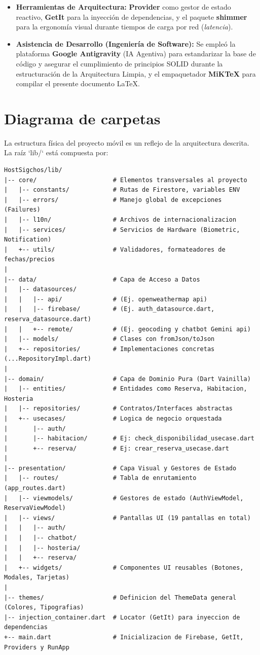 \documentclass[12pt,letterpaper]{report}
\newcommand{\tech}[1]{\textbf{#1}}
\begin{document}
\begin{itemize}[label=$\blacksquare$]
    \item \textbf{Herramientas de Arquitectura:} \tech{Provider} como gestor de estado reactivo, \tech{GetIt} para la inyección de dependencias, y el paquete \tech{shimmer} para la ergonomía visual durante tiempos de carga por red (\textit{latencia}).
    \item \textbf{Asistencia de Desarrollo (Ingeniería de Software):} Se empleó la plataforma \tech{Google Antigravity} (IA Agentiva) para estandarizar la base de código y asegurar el cumplimiento de principios SOLID durante la estructuración de la Arquitectura Limpia, y el empaquetador \tech{MiKTeX} para compilar el presente documento LaTeX.
\end{itemize}

\section{Diagrama de carpetas}
La estructura física del proyecto móvil es un reflejo de la arquitectura descrita. La raíz `lib/` está compuesta por:

\begin{lstlisting}[style=codeblock]
HostSigchos/lib/
|-- core/                     # Elementos transversales al proyecto
|   |-- constants/            # Rutas de Firestore, variables ENV
|   |-- errors/               # Manejo global de excepciones (Failures)
|   |-- l10n/                 # Archivos de internacionalizacion
|   |-- services/             # Servicios de Hardware (Biometric, Notification)
|   +-- utils/                # Validadores, formateadores de fechas/precios
|
|-- data/                     # Capa de Acceso a Datos
|   |-- datasources/
|   |   |-- api/              # (Ej. openweathermap api)
|   |   |-- firebase/         # (Ej. auth_datasource.dart, reserva_datasource.dart)
|   |   +-- remote/           # (Ej. geocoding y chatbot Gemini api)
|   |-- models/               # Clases con fromJson/toJson
|   +-- repositories/         # Implementaciones concretas (...RepositoryImpl.dart)
|
|-- domain/                   # Capa de Dominio Pura (Dart Vainilla)
|   |-- entities/             # Entidades como Reserva, Habitacion, Hosteria
|   |-- repositories/         # Contratos/Interfaces abstractas
|   +-- usecases/             # Logica de negocio orquestada
|       |-- auth/
|       |-- habitacion/       # Ej: check_disponibilidad_usecase.dart
|       +-- reserva/          # Ej: crear_reserva_usecase.dart
|
|-- presentation/             # Capa Visual y Gestores de Estado
|   |-- routes/               # Tabla de enrutamiento (app_routes.dart)
|   |-- viewmodels/           # Gestores de estado (AuthViewModel, ReservaViewModel)
|   |-- views/                # Pantallas UI (19 pantallas en total)
|   |   |-- auth/
|   |   |-- chatbot/
|   |   |-- hosteria/
|   |   +-- reserva/
|   +-- widgets/              # Componentes UI reusables (Botones, Modales, Tarjetas)
|
|-- themes/                   # Definicion del ThemeData general (Colores, Tipografias)
|-- injection_container.dart  # Locator (GetIt) para inyeccion de dependencias
+-- main.dart                 # Inicializacion de Firebase, GetIt, Providers y RunApp
\end{lstlisting}
\end{document}
